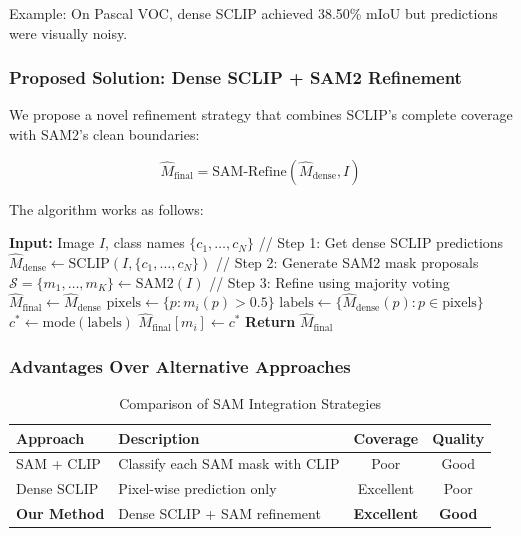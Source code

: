 Example: On Pascal VOC, dense SCLIP achieved 38.50\% mIoU but predictions were visually noisy.

\subsubsection{Proposed Solution: Dense SCLIP + SAM2 Refinement}

We propose a novel refinement strategy that combines SCLIP's complete coverage with SAM2's clean boundaries:

\begin{equation}
\label{eq:sam_refinement_main}
\hat{M}_{\text{final}} = \text{SAM-Refine}(\hat{M}_{\text{dense}}, I)
\end{equation}

The algorithm works as follows:

\begin{algorithmic}[1]
\STATE \textbf{Input:} Image $I$, class names $\{c_1, \ldots, c_N\}$
\STATE // Step 1: Get dense SCLIP predictions
\STATE $\hat{M}_{\text{dense}} \gets \text{SCLIP}(I, \{c_1, \ldots, c_N\})$
\STATE // Step 2: Generate SAM2 mask proposals
\STATE $\mathcal{S} = \{m_1, \ldots, m_K\} \gets \text{SAM2}(I)$
\STATE // Step 3: Refine using majority voting
\STATE $\hat{M}_{\text{final}} \gets \hat{M}_{\text{dense}}$ 
    \STATE $\text{pixels} \gets \{p : m_i(p) > 0.5\}$ 
    \STATE $\text{labels} \gets \{\hat{M}_{\text{dense}}(p) : p \in \text{pixels}\}$
    \STATE $c^* \gets \text{mode}(\text{labels})$ 
    \STATE $\hat{M}_{\text{final}}[m_i] \gets c^*$ 
\ENDFOR
\STATE \textbf{Return} $\hat{M}_{\text{final}}$
\end{algorithmic}

\subsubsection{Advantages Over Alternative Approaches}

\begin{table}[h]
\centering
\caption{Comparison of SAM Integration Strategies}
\label{tab:sam_strategies}
\begin{tabular}{lp{5cm}cc}
\hline
\textbf{Approach} & \textbf{Description} & \textbf{Coverage} & \textbf{Quality} \\
\hline
SAM + CLIP & Classify each SAM mask with CLIP & Poor & Good \\
Dense SCLIP & Pixel-wise prediction only & Excellent & Poor \\
\textbf{Our Method} & Dense SCLIP + SAM refinement & \textbf{Excellent} & \textbf{Good} \\
\hline
\end{tabular}
\end{table}


